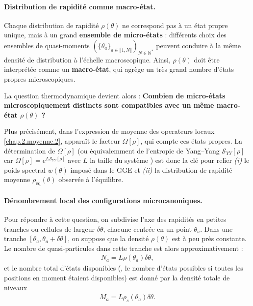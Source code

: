 
\paragraph{Distribution de rapidité comme macro-état.}

Chaque distribution de rapidité $\rho(\theta)$ ne correspond pas à un état propre unique, mais à un grand {\bf ensemble de micro-états} : différents choix des ensembles de quasi-moments $(\{\theta_a\}_{a \in \llbracket 1 , N \rrbracket })_{N \in \mathbb{N}^\ast} $ peuvent conduire à la même densité de distribution à l’échelle macroscopique. Ainsi, $\rho(\theta)$ doit être interprétée comme un {\bf macro-état}, qui agrège un très grand nombre d’états propres microscopiques.

La question thermodynamique devient alors : {\bf Combien de micro-états microscopiquement distincts sont compatibles avec un même macro-état $\rho(\theta)$ ?} 

\medskip
Plus précisément, dans l’expression de moyenne des operateurs locaux \eqref{chap.2.moyenne.2}, apparaît le facteur
\(
\Omega[\rho]
\),
qui compte ces états propres.  
La détermination de $\Omega[\rho]$ (ou équivalemment de l’entropie de Yang–Yang $\mathcal{S}_{YY}[\rho]$ car 
\(
\Omega[\rho] = e^{L\mathcal{S}_{YY}[\rho]}
\)
avec $L$ la taille du système
) est donc la clé pour relier \emph{(i)} le poids spectral $w(\theta)$ imposé dans le GGE et \emph{(ii)} la distribution de rapidité moyenne $\rho_{\mathrm{eq}}(\theta)$ observée à l’équilibre.

\paragraph{Dénombrement local des configurations microcanoniques.}
Pour répondre à cette question, on subdivise l’axe des rapidités en petites tranches ou cellules de largeur $\delta \theta$, chacune centrée en un point $\theta_a$. Dans une tranche $[\theta_a, \theta_a + \delta\theta]$, on suppose que la densité $\rho(\theta)$ est à peu près constante. Le nombre de quasi-particules dans cette tranche est alors approximativement :
\begin{eqnarray*}
	N_a = L\rho(\theta_a) \delta \theta,
\end{eqnarray*}
et le nombre total d'états disponibles (\ie, le nombre d’états possibles si toutes les positions en moment étaient disponibles) est donné par la densité totale de niveaux 
\begin{eqnarray*}
	M_a = L\rho_s(\theta_a) \delta \theta.
\end{eqnarray*}

